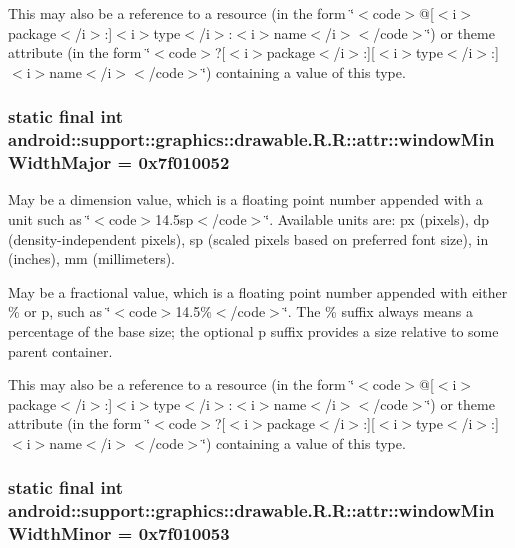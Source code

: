 This may also be a reference to a resource (in the form \char`\"{}$<$code$>$@\mbox{[}$<$i$>$package$<$/i$>$:\mbox{]}$<$i$>$type$<$/i$>$:$<$i$>$name$<$/i$>$$<$/code$>$\char`\"{}) or theme attribute (in the form \char`\"{}$<$code$>$?\mbox{[}$<$i$>$package$<$/i$>$:\mbox{]}\mbox{[}$<$i$>$type$<$/i$>$:\mbox{]}$<$i$>$name$<$/i$>$$<$/code$>$\char`\"{}) containing a value of this type. \hypertarget{classandroid_1_1support_1_1graphics_1_1drawable_1_1_r_1_1attr_d34b72698a8b9265c826ffb788ad2bc8}{
\subsubsection[{windowMinWidthMajor}]{\setlength{\rightskip}{0pt plus 5cm}static final int android::support::graphics::drawable.R.R::attr::windowMinWidthMajor = 0x7f010052}}
\label{classandroid_1_1support_1_1graphics_1_1drawable_1_1_r_1_1attr_d34b72698a8b9265c826ffb788ad2bc8}


May be a dimension value, which is a floating point number appended with a unit such as \char`\"{}$<$code$>$14.5sp$<$/code$>$\char`\"{}. Available units are: px (pixels), dp (density-independent pixels), sp (scaled pixels based on preferred font size), in (inches), mm (millimeters). 

May be a fractional value, which is a floating point number appended with either \% or p, such as \char`\"{}$<$code$>$14.5\%$<$/code$>$\char`\"{}. The \% suffix always means a percentage of the base size; the optional p suffix provides a size relative to some parent container. 

This may also be a reference to a resource (in the form \char`\"{}$<$code$>$@\mbox{[}$<$i$>$package$<$/i$>$:\mbox{]}$<$i$>$type$<$/i$>$:$<$i$>$name$<$/i$>$$<$/code$>$\char`\"{}) or theme attribute (in the form \char`\"{}$<$code$>$?\mbox{[}$<$i$>$package$<$/i$>$:\mbox{]}\mbox{[}$<$i$>$type$<$/i$>$:\mbox{]}$<$i$>$name$<$/i$>$$<$/code$>$\char`\"{}) containing a value of this type. \hypertarget{classandroid_1_1support_1_1graphics_1_1drawable_1_1_r_1_1attr_4dc1f9434a2d289cde4bdcdf17f535ac}{
\subsubsection[{windowMinWidthMinor}]{\setlength{\rightskip}{0pt plus 5cm}static final int android::support::graphics::drawable.R.R::attr::windowMinWidthMinor = 0x7f010053}}
\label{classandroid_1_1support_1_1graphics_1_1drawable_1_1_r_1_1attr_4dc1f9434a2d289cde4bdcdf17f535ac}


